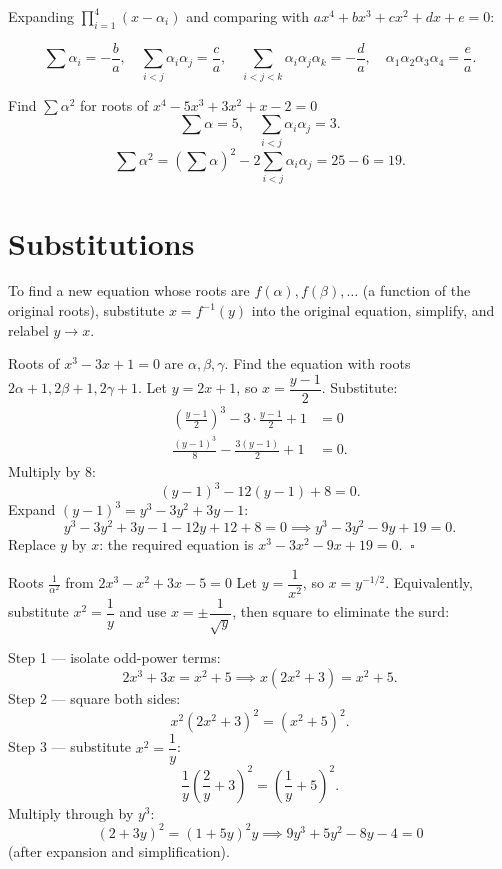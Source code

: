 \documentclass[12pt,a4paper]{article}
\theoremstyle{defstyle}
\begin{document}
Expanding \(\prod_{i=1}^{4}(x-\alpha_i)\) and comparing with \(ax^4+bx^3+cx^2+dx+e=0\):

\begin{result}{}{}
\[
  \sum\alpha_i = -\frac{b}{a},\quad
  \sum_{i<j}\alpha_i\alpha_j = \frac{c}{a},\quad
  \sum_{i<j<k}\alpha_i\alpha_j\alpha_k = -\frac{d}{a},\quad
  \alpha_1\alpha_2\alpha_3\alpha_4 = \frac{e}{a}.
\]
\end{result}

\begin{example}{Find $\sum\alpha^2$ for roots of $x^4-5x^3+3x^2+x-2=0$}{}
\[
  \sum\alpha = 5,\quad \sum_{i<j}\alpha_i\alpha_j = 3.
\]
\[
  \sum\alpha^2 = \left(\sum\alpha\right)^2 - 2\sum_{i<j}\alpha_i\alpha_j = 25 - 6 = 19.
\]
\end{example}

\section{Substitutions}

To find a new equation whose roots are \(f(\alpha), f(\beta), \ldots\) (a function of the original roots), substitute \(x = f^{-1}(y)\) into the original equation, simplify, and relabel \(y\to x\).

\begin{example}{Roots of $x^3-3x+1=0$ are $\alpha,\beta,\gamma$. Find the equation with roots $2\alpha+1,2\beta+1,2\gamma+1$.}{}
Let \(y = 2x+1\), so \(x = \dfrac{y-1}{2}\). Substitute:
\[
\begin{aligned}
  \left(\frac{y-1}{2}\right)^3 - 3\cdot\frac{y-1}{2}+1 &= 0 \\[4pt]
  \frac{(y-1)^3}{8} - \frac{3(y-1)}{2}+1 &= 0.
\end{aligned}
\]
Multiply by 8:
\[
  (y-1)^3 - 12(y-1)+8 = 0.
\]
Expand \((y-1)^3 = y^3-3y^2+3y-1\):
\[
  y^3-3y^2+3y-1-12y+12+8 = 0 \implies y^3-3y^2-9y+19 = 0.
\]
Replace \(y\) by \(x\): the required equation is \(x^3-3x^2-9x+19=0\). \(\ \square\)
\end{example}

\begin{example}{Roots $\frac{1}{\alpha^2}$ from $2x^3-x^2+3x-5=0$}{}
Let \(y=\dfrac{1}{x^2}\), so \(x=y^{-1/2}\).  Equivalently, substitute \(x^2=\dfrac{1}{y}\) and use \(x = \pm\dfrac{1}{\sqrt{y}}\), then square to eliminate the surd:

Step 1 --- isolate odd-power terms:
\[
  2x^3+3x = x^2+5 \implies x(2x^2+3)=x^2+5.
\]
Step 2 --- square both sides:
\[
  x^2(2x^2+3)^2=(x^2+5)^2.
\]
Step 3 --- substitute \(x^2=\dfrac{1}{y}\):
\[
  \frac{1}{y}\left(\frac{2}{y}+3\right)^2=\left(\frac{1}{y}+5\right)^2.
\]
Multiply through by \(y^3\):
\[
  (2+3y)^2 = (1+5y)^2 y \implies 9y^3+5y^2-8y-4=0
\]
(after expansion and simplification).
\end{example}
\end{document}
